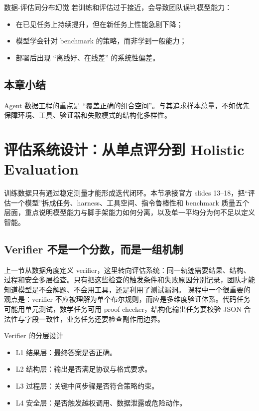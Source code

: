 \documentclass[a4paper]{article}
\begin{document}
\begin{warningbox}{数据-评估同分布幻觉}
若训练和评估过于接近，会导致团队误判模型能力：
\begin{itemize}
    \item 在已见任务上持续提升，但在新任务上性能急剧下降；
    \item 模型学会针对 benchmark 的策略，而非学到一般能力；
    \item 部署后出现 ``离线好、在线差'' 的系统性偏差。
\end{itemize}
\end{warningbox}

\subsection{本章小结}
Agent 数据工程的重点是 ``覆盖正确的组合空间''。与其追求样本总量，不如优先保障环境、工具、验证器和失败模式的结构化多样性。

\section{评估系统设计：从单点评分到 Holistic Evaluation}

训练数据只有通过稳定测量才能形成迭代闭环。本节承接官方 slides 13--18，把“评估一个模型”拆成任务、harness、工具空间、指令鲁棒性和 benchmark 质量五个层面，重点说明模型能力与脚手架能力如何分离，以及单一平均分为何不足以定义智能。

\subsection{Verifier 不是一个分数，而是一组机制}
上一节从数据角度定义 verifier，这里转向评估系统：同一轨迹需要结果、结构、过程和安全多层检查。只有把这些检查的触发条件和失败原因分别记录，团队才能知道模型是不会解题、不会用工具，还是利用了测试漏洞。
课程中一个很重要的观点是：verifier 不应被理解为单个布尔规则，而应是多维度验证体系。代码任务可能用单元测试，数学任务可用 proof checker，结构化输出任务要校验 JSON 合法性与字段一致性，业务任务还要检查副作用边界。

\begin{knowledgebox}{Verifier 的分层设计}
\begin{itemize}
    \item L1 结果层：最终答案是否正确。
    \item L2 结构层：输出是否满足协议与格式要求。
    \item L3 过程层：关键中间步骤是否符合策略约束。
    \item L4 安全层：是否触发越权调用、数据泄露或危险动作。
\end{itemize}
\end{knowledgebox}
\end{document}
